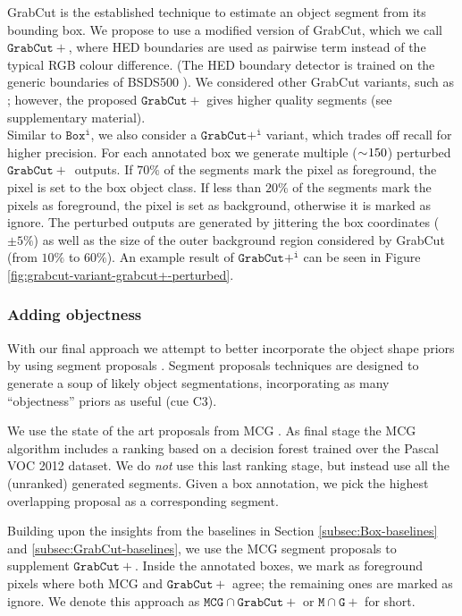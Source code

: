 \documentclass[10pt,english,british,twocolumn]{article}
\begin{document}
GrabCut \cite{Rother2004TogGrabcut} is the established technique
to estimate an object segment from its bounding box. We propose to
use a modified version of GrabCut, which we call $\mathtt{GrabCut+}$,
where HED boundaries \cite{Xie2015Iccv} are used as pairwise term
instead of the typical RGB colour difference. (The HED boundary detector
is trained on the generic boundaries of BSDS500 \cite{ArbelaezMaireFowlkesMalikPAMI11}).
We considered other GrabCut variants, such as \cite{Cheng2015CgfDenseCut,Tang2015IccvSecretGrabCut};
however, the proposed $\mathtt{GrabCut+}$ gives higher quality segments
(see supplementary material).\\
Similar to $\mathtt{Box^{i}}$, we also consider a $\mathtt{GrabCut+^{i}}$
variant, which trades off recall for higher precision. For each annotated
box we generate multiple ($\sim\negmedspace150$) perturbed $\mathtt{GrabCut+}$\texttt{
}outputs. If $70\%$ of the segments mark the pixel as foreground,
the pixel is set to the box object class. If less than $20\%$ of
the segments mark the pixels as foreground, the pixel is set as background,
otherwise it is marked as ignore. The perturbed outputs are generated
by jittering the box coordinates ($\pm5\%$) as well as the size of
the outer background region considered by GrabCut (from $10\%$ to
$60\%$). An example result of $\mathtt{GrabCut+^{i}}$ can be seen
in Figure \ref{fig:grabcut-variant-grabcut+-perturbed}.

\subsubsection{Adding objectness}

With our final approach we attempt to better incorporate the object
shape priors by using segment proposals \cite{PontTuset2015Iccv}.
Segment proposals techniques are designed to generate a soup of likely
object segmentations, incorporating as many ``objectness'' priors
as useful (cue C3). 

We use the state of the art proposals from MCG \cite{PontTuset2015ArxivMcg}.
As final stage the MCG algorithm includes a ranking based on a decision
forest trained over the Pascal VOC 2012 dataset. We do \emph{not}
use this last ranking stage, but instead use all the (unranked) generated
segments. Given a box annotation, we pick the highest overlapping
proposal as a corresponding segment.

Building upon the insights from the baselines in Section \ref{subsec:Box-baselines}
and \ref{subsec:GrabCut-baselines}, we use the MCG segment proposals
to supplement $\mathtt{GrabCut+}$. Inside the annotated boxes, we
mark as foreground pixels where both MCG and $\mathtt{GrabCut+}$
agree; the remaining ones are marked as ignore. We denote this approach
as $\mathtt{MCG}\cap\mathtt{GrabCut+}$ or $\mathtt{M}\cap\mathtt{G+}$
for short.
\end{document}
